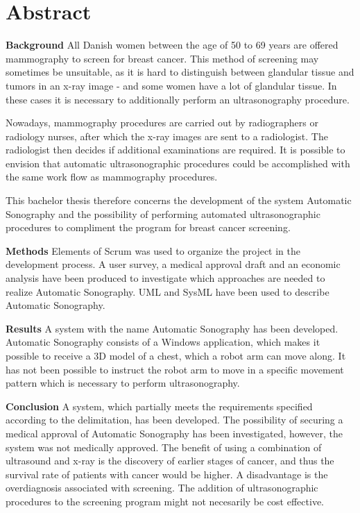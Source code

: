 \chapter{Abstract}\label{kapitel_Abstract}
\textbf{Background} \newline
All Danish women between the age of 50 to 69 years are offered 
mammography to screen for breast cancer. This method of screening may sometimes be unsuitable, as it is hard to distinguish between glandular tissue and tumors in an x-ray image - and some women have a lot of glandular tissue. In these cases it is necessary to additionally perform an ultrasonography procedure.

Nowadays, mammography procedures are carried out by radiographers or radiology nurses, after which the x-ray images are sent to a radiologist. The radiologist then decides if additional examinations are required. It is possible to envision that automatic ultrasonographic procedures could be accomplished with the same work flow as mammography procedures.

This bachelor thesis therefore concerns the development of the system Automatic Sonography and the possibility of performing automated ultrasonographic procedures to compliment the program for breast cancer screening.

\textbf{Methods} \newline
Elements of Scrum was used to organize the project in the development process. A user survey, a medical approval draft and an economic analysis have been produced to investigate which approaches are needed to realize Automatic Sonography. UML and SysML have been used to describe Automatic Sonography.

\textbf{Results} \newline
A system with the name Automatic Sonography has been developed. Automatic Sonography consists of a Windows application, which makes it possible to receive a 3D model of a chest, which a robot arm can move along. It has not been possible to instruct the robot arm to move in a specific movement pattern which is necessary to perform ultrasonography.

\textbf{Conclusion} \newline
A system, which partially meets the requirements specified according to the delimitation, has been developed. The possibility of securing a medical approval of Automatic Sonography has been investigated, however, the system was not medically approved. The benefit of using a combination of ultrasound and x-ray is the discovery of earlier stages of cancer, and thus the survival rate of patients with cancer would be higher. A disadvantage is the overdiagnosis associated with screening. The addition of ultrasonographic procedures to the screening program might not necesarily be cost effective.